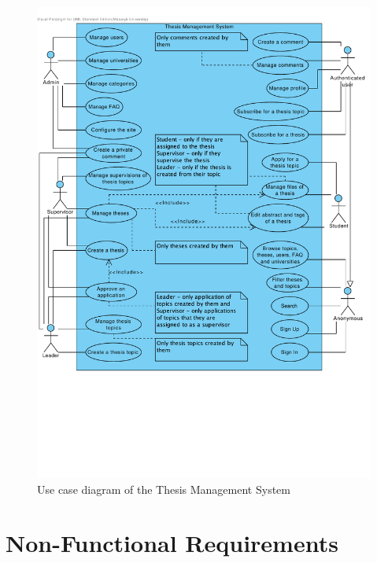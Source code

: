 \begin{figure}[H]
    \centering
        \includegraphics[trim=0 190 10 30, clip, keepaspectratio, width=\textwidth]{./images/use-case.pdf}
    \caption{Use case diagram of the Thesis Management System}
    \label{fig:use-case}
\end{figure}

\section{Non-Functional Requirements}

